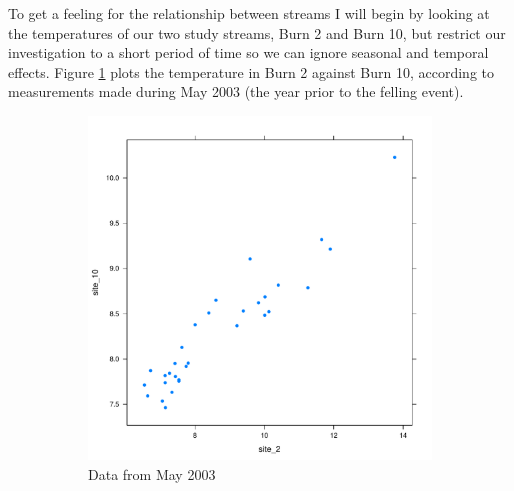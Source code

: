 To get a feeling for the relationship between streams I will begin by looking at the temperatures of our two study streams, Burn 2 and Burn 10, but restrict our investigation to a short period of time so we can ignore seasonal and temporal effects.  Figure \ref{fig:chptr4:simpleplot1a} plots the temperature in Burn 2 against Burn 10, according to measurements made during May 2003 (the year prior to the felling event).

\begin{figure}
\centering
  \begin{subfigure}[b]{0.45\textwidth}
    \centering
    \includegraphics[width=\textwidth]{simpleExampleplot-1}
    \caption{Data from May 2003}
    \label{fig:chptr4:simpleplot1a}
  \end{subfigure}
  \hfill
  \begin{subfigure}[b]{0.45\textwidth}
    \centering

\end{subfigure}
\end{figure}

